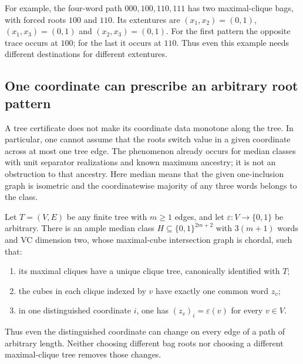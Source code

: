 For example, the four-word path $000,100,110,111$ has two maximal-clique
bags, with forced roots $100$ and $110$. Its extentures are
$(x_1,x_2)=(0,1)$, $(x_1,x_3)=(0,1)$ and $(x_2,x_3)=(0,1)$.
For the first pattern the opposite trace occurs at $100$; for the last it
occurs at $110$. Thus even this example needs different destinations for
different extentures.

\subsection{One coordinate can prescribe an arbitrary root pattern}
\label{sec:maxmin-tree-arbitrary-root-patterns}

A tree certificate does not make its coordinate data monotone along the
tree. In particular, one cannot assume that the roots switch value in a
given coordinate across at most one tree edge. The phenomenon already
occurs for median classes with unit separator realizations and known
maximum ancestry; it is not an obstruction to that ancestry. Here median
means that the given one-inclusion graph is isometric and the
coordinatewise majority of any three words belongs to the class.

\begin{proposition}
\label{prop:maxmin-arbitrary-clique-root-patterns}
Let $T=(V,E)$ be any finite tree with $m\ge1$ edges, and let
$\varepsilon:V\to\{0,1\}$ be arbitrary. There is an ample median class
$H\subseteq\{0,1\}^{2m+2}$ with $3(m+1)$ words and VC dimension two,
whose maximal-cube intersection graph is chordal, such that:
\begin{enumerate}
\item its maximal cliques have a unique clique tree, canonically
      identified with $T$;
\item the cubes in each clique indexed by $v$ have exactly one common
      word $z_v$;
\item in one distinguished coordinate $i$, one has
      $(z_v)_i=\varepsilon(v)$ for every $v\in V$.
\end{enumerate}
Thus even the distinguished coordinate can change on every edge of a
path of arbitrary length. Neither choosing different bag roots nor
choosing a different maximal-clique tree removes those changes.
\end{proposition}

